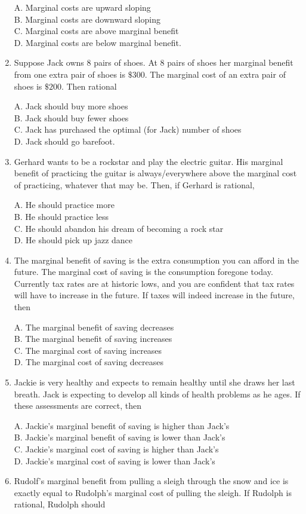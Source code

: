 \documentclass[
]{book}
\begin{document}
\begin{enumerate}
  A. Marginal costs are upward sloping\\
  B. Marginal costs are downward sloping\\
  C. Marginal costs are above marginal benefit\\
  D. Marginal costs are below marginal benefit.
\item
  Suppose Jack owns 8 pairs of shoes. At 8 pairs of shoes her marginal benefit from one extra pair of shoes is \(\$300\). The marginal cost of an extra pair of shoes is \(\$200\). Then rational

  A. Jack should buy more shoes\\
  B. Jack should buy fewer shoes\\
  C. Jack has purchased the optimal (for Jack) number of shoes\\
  D. Jack should go barefoot.
\item
  Gerhard wants to be a rockstar and play the electric guitar. His marginal benefit of practicing the guitar is always/everywhere above the marginal cost of practicing, whatever that may be. Then, if Gerhard is rational,

  A. He should practice more\\
  B. He should practice less\\
  C. He should abandon his dream of becoming a rock star\\
  D. He should pick up jazz dance
\item
  The marginal benefit of saving is the extra consumption you can afford in the future. The marginal cost of saving is the consumption foregone today. Currently tax rates are at historic lows, and you are confident that tax rates will have to increase in the future. If taxes will indeed increase in the future, then

  A. The marginal benefit of saving decreases\\
  B. The marginal benefit of saving increases\\
  C. The marginal cost of saving increases\\
  D. The marginal cost of saving decreases
\item
  Jackie is very healthy and expects to remain healthy until she draws her last breath. Jack is expecting to develop all kinds of health problems as he ages. If these assessments are correct, then

  A. Jackie's marginal benefit of saving is higher than Jack's\\
  B. Jackie's marginal benefit of saving is lower than Jack's\\
  C. Jackie's marginal cost of saving is higher than Jack's\\
  D. Jackie's marginal cost of saving is lower than Jack's
\item
  Rudolf's marginal benefit from pulling a sleigh through the snow and ice is exactly equal to Rudolph's marginal cost of pulling the sleigh. If Rudolph is rational, Rudolph should


\end{enumerate}
\end{document}

